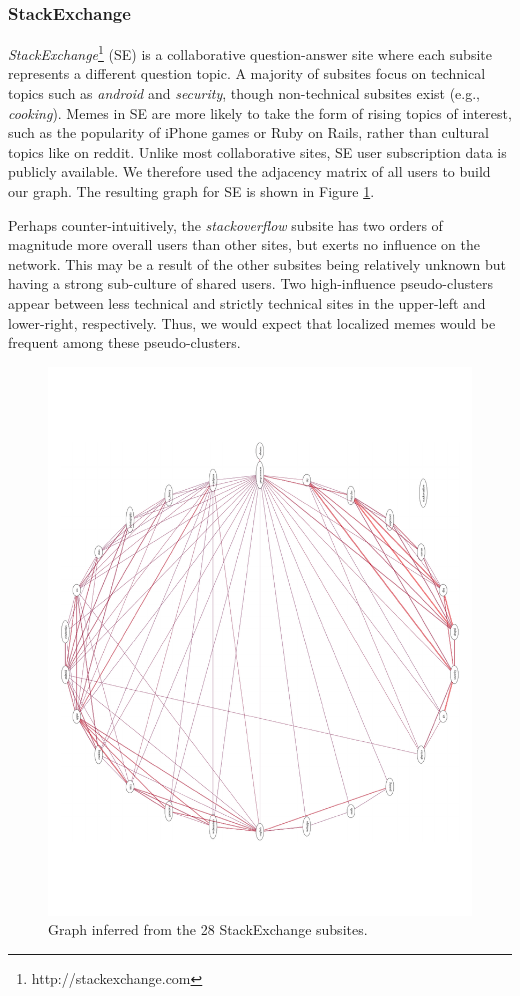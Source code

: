 \documentclass{article} %
\begin{document}
\subsubsection{StackExchange}
\textit{StackExchange}\footnote{http://stackexchange.com} (SE) is a collaborative question-answer site where each subsite represents a different question topic. A majority of subsites focus on technical topics such as \textit{android} and \textit{security}, though non-technical subsites exist (e.g., \textit{cooking}). Memes in SE are more likely to take the form of rising topics of interest, such as the popularity of iPhone games or Ruby on Rails, rather than cultural topics like on reddit. Unlike most collaborative sites, SE user subscription data is publicly available. We therefore used the adjacency matrix of all users to build our graph. The resulting graph for SE is shown in Figure \ref{fig:stackexchange}.

Perhaps counter-intuitively, the \textit{stackoverflow} subsite has two orders of magnitude more overall users than other sites, but exerts no influence on the network. This may be a result of the other subsites being relatively unknown but having a strong sub-culture of shared users. Two high-influence pseudo-clusters appear between less technical and strictly technical sites in the upper-left and lower-right, respectively. Thus, we would expect that localized memes would be frequent among these pseudo-clusters.

\begin{figure}[htb]
\centering
\includegraphics[width=\textwidth]{stackexchange.pdf}
\caption{Graph inferred from the 28 StackExchange subsites.}
\label{fig:stackexchange}
\end{figure}
\end{document}
